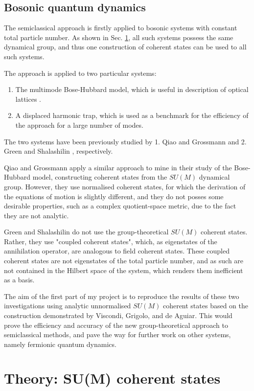 \documentclass[12pt]{article}
\begin{document}
	\subsection{Bosonic quantum dynamics}\label{sec:two applications}
	The semiclassical approach is firstly applied to bosonic systems with constant total particle number. As shown in Sec. \ref{sec:sum}, all such systems possess the same dynamical group, and thus one construction of coherent states can be used to all such systems.
	
	The approach is applied to two particular systems:
	\begin{enumerate}
		\item The multimode Bose-Hubbard model, which is useful in description of optical lattices \cite{optical_lattices}.
		\item A displaced harmonic trap, which is used as a benchmark for the efficiency of the approach for a large number of modes.
	\end{enumerate}
	The two systems have been previously studied by 1. Qiao and Grossmann \cite{grossmann} and 2. Green and Shalashilin \cite{green}, respectively.
	
	Qiao and Grossmann apply a similar approach to mine in their study of the Bose-Hubbard model, constructing coherent states from the $SU(M)$ dynamical group. However, they use normalised coherent states, for which the derivation of the equations of motion is slightly different, and they do not posses some desirable properties, such as a complex quotient-space metric, due to the fact they are not analytic.
	
	Green and Shalashilin do not use the group-theoretical $SU(M)$ coherent states. Rather, they use "coupled coherent states", which, as eigenstates of the annihilation operator, are analogous to field coherent states. These coupled coherent states are not eigenstates of the total particle number, and as such are not contained in the Hilbert space of the system, which renders them inefficient as a basis.
	
	The aim of the first part of my project is to reproduce the results of these two investigations using analytic unnormalised $SU(M)$ coherent states based on the construction demonstrated by Viscondi, Grigolo, and de Aguiar. This would prove the efficiency and accuracy of the new group-theoretical approach to semiclassical methods, and pave the way for further work on other systems, namely fermionic quantum dynamics.
	
	\section{Theory: SU(M) coherent states} \label{sec:sum}
	
\end{document}
